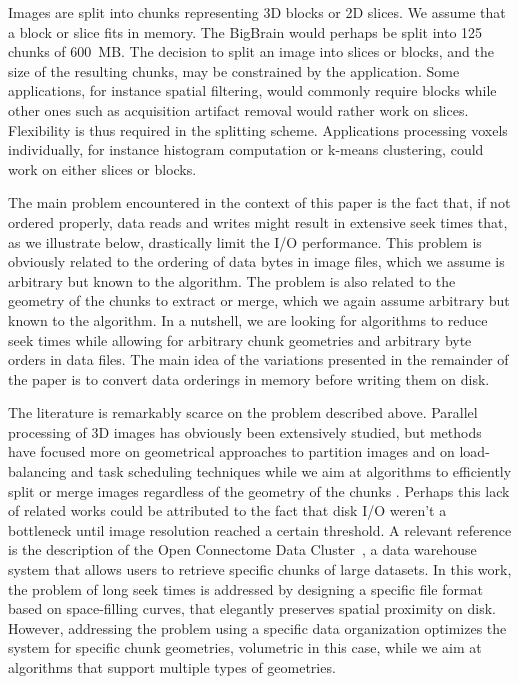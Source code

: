 \documentclass[10pt, conference, compsocconf]{IEEEtran}
\newcommand{\todo}[1]{\marginpar{\parbox{18mm}{\flushleft\tiny\color{red}\textbf{TODO}:
      #1}}}
\begin{document}

Images are split into chunks representing 3D blocks or 2D slices. We
assume that a block or slice fits in memory. The BigBrain would
perhaps be split into 125 chunks of 600~MB. The decision to split an
image into slices or blocks, and the size of the resulting chunks, may
be constrained by the application. Some applications, for instance
spatial filtering, would commonly require blocks while other ones such
as acquisition artifact removal would rather work on
slices. Flexibility is thus required in the splitting
scheme. Applications processing voxels individually, for instance
histogram computation or k-means clustering, could work on either
slices or blocks.

The main problem encountered in the context of this paper is the fact
that, if not ordered properly, data reads and writes might result in
extensive seek times that, as we illustrate below, drastically limit
the I/O performance. This problem is obviously related to the ordering
of data bytes in image files, which we assume is arbitrary but known
to the algorithm. The problem is also related to the geometry of the
chunks to extract or merge, which we again assume arbitrary but known
to the algorithm. In a nutshell, we are looking for algorithms to
reduce seek times while allowing for arbitrary chunk geometries and
arbitrary byte orders in data files. The main idea of the variations
presented in the remainder of the paper is to convert data orderings
in memory before writing them on disk. 

The literature is remarkably scarce on the problem described
above. Parallel processing of 3D images has obviously been extensively
studied, but methods have focused more on geometrical approaches to
partition images and on load-balancing and task scheduling techniques
while we aim at algorithms to efficiently split or merge images
regardless of the geometry of the chunks \todo{do a serious literature
review on this topic}. Perhaps this lack of related works could be
attributed to the fact that disk I/O weren't a bottleneck until image
resolution reached a certain threshold. A relevant reference is the
description of the Open Connectome Data Cluster~\cite{burns2013open},
a data warehouse system that allows users to retrieve specific chunks
of large datasets. In this work, the problem of long seek times is
addressed by designing a specific file format based on space-filling
curves, that elegantly preserves spatial proximity on disk. However,
addressing the problem using a specific data organization optimizes
the system for specific chunk geometries, volumetric in this case,
while we aim at algorithms that support multiple types of geometries.
\end{document}
